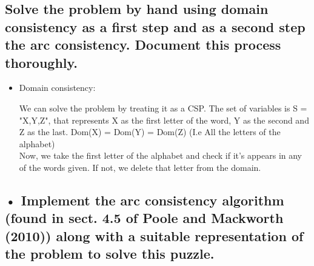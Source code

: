 \documentclass[paper=a4, fontsize=11pt]{scrartcl} %
\numberwithin{equation}{section} %
\numberwithin{figure}{section} %
\numberwithin{table}{section} %
\begin{document}
\subsection*{Solve the problem by hand using domain consistency as a first step and as a second step the arc consistency. Document this process thoroughly.}

 \begin{itemize}
 
 \item Domain consistency: 
 
We can solve the problem by treating it as a CSP. The set of variables is \newline S = "X,Y,Z", that represents X as the first letter of the word, Y as the second and Z as the last. Dom(X) = Dom(Y) = Dom(Z) (I.e All the letters of the alphabet)\\

Now, we take the first letter of the alphabet and check if it's appears in any of the words given. If not, we delete that letter from the domain.



 
 
 

 \end{itemize}



\subsection*{• Implement the arc consistency algorithm (found in sect. 4.5 of Poole and Mackworth (2010)) along with a suitable representation of the problem to solve this puzzle.}







\end{document}

